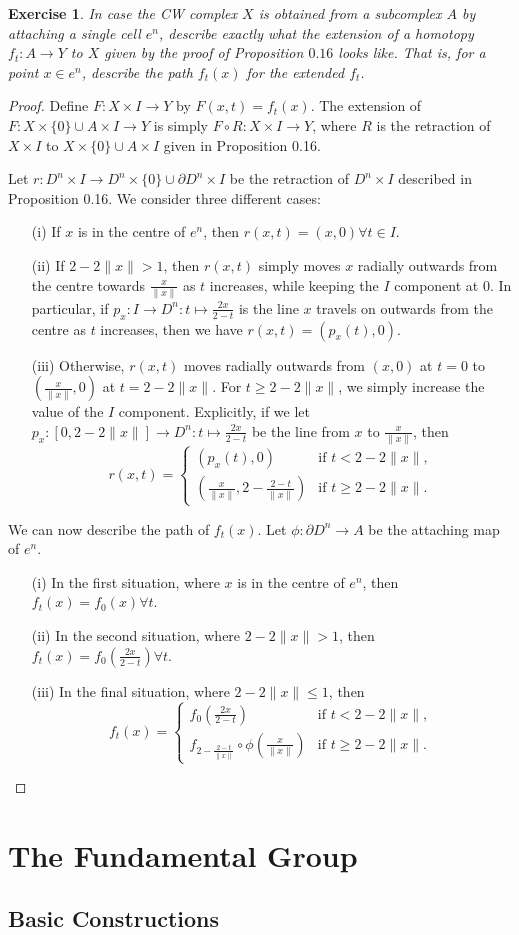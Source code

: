\documentclass{article}
\newtheorem{exercise}[theorem]{Exercise}
\begin{document}
\begin{exercise}
In case the CW complex $X$ is obtained from a subcomplex $A$ by attaching a single cell $e^n$, describe exactly what the extension of a homotopy $f_t:A\to Y$ to $X$ given by the proof of Proposition $0.16$ looks like. That is, for a point $x\in e^n$, describe the path $f_t(x)$ for the extended $f_t$.
\end{exercise}
\begin{proof}
Define $F:X\times I\to Y$ by $F(x,t)=f_t(x)$. The extension of $F:X\times\{0\}\cup A\times I\to Y$ is simply $F\circ R:X\times I\to Y$, where $R$ is the retraction of $X\times I$ to $X\times\{0\}\cup A\times I$ given in Proposition 0.16.

Let $r:D^n\times I\to D^n\times\{0\}\cup \partial D^n\times I$ be the retraction of $D^n\times I$ described in Proposition 0.16. 
We consider three different cases:
\begin{enumerate}
\item[(i)] If $x$ is in the centre of $e^n$, then $r(x,t)=(x,0)\forall t\in I$. 

\item[(ii)] If $2-2\|x\|> 1$, then $r(x,t)$ simply moves $x$ radially outwards from the centre towards $\frac{x}{\|x\|}$ as $t$ increases, while keeping the $I$ component at $0$. In particular, if $p_x:I\to D^n:t\mapsto\frac{2x}{2-t}$ is the line $x$ travels on outwards from the centre as $t$ increases, then we have $r(x,t)=(p_x(t),0)$.

\item[(iii)] Otherwise,  $r(x,t)$ moves radially outwards from $(x,0)$ at $t=0$ to $\left(\frac{x}{\|x\|},0\right)$ at $t=2-2\|x\|$. For $t\geq2-2\|x\|$, we simply increase the value of the $I$ component. Explicitly, if we let $p_x:[0,2-2\|x\|]\to D^n:t\mapsto\frac{2x}{2-t}$ be the line from $x$ to $\frac{x}{\|x\|}$, then\[r(x,t)=\begin{cases}
    (p_x(t),0)&\text{if }t< 2-2\|x\|,\\
    \left(\frac{x}{\|x\|},2-\frac{2-t}{\|x\|}\right)&\text{if }t\geq2-2\|x\|.
\end{cases}\]
\end{enumerate}
We can now describe the path of $f_t(x)$. Let $\phi:\partial D^n\to A$ be the attaching map of $e^n$.
\begin{enumerate}
\item[(i)] In the first situation, where $x$ is in the centre of $e^n$, then $f_t(x)=f_0(x)\forall t$.
\item[(ii)] In the second situation, where $2-2\|x\|> 1$, then $f_t(x)=f_0\left(\frac{2x}{2-t}\right)\forall t$.
\item[(iii)] In the final situation, where $2-2\|x\|\leq 1$, then\[f_t(x)=\begin{cases}
    f_0\left(\frac{2x}{2-t}\right)&\text{if }t<2-2\|x\|,\\
    f_{2-\frac{2-t}{\|x\|}}\circ\phi\left(\frac{x}{\|x\|}\right)&\text{if }t\geq 2-2\|x\|.
\end{cases}\]
\end{enumerate}
\end{proof}
\section{The Fundamental Group}
\subsection{Basic Constructions}
\end{document}
